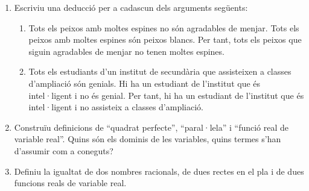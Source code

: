 \begin{enumerate}
\begin{enumerate}
\item
\begin{tabular}
[c]{ll}%
$P_{1}:$ & $\left(  \forall x\right)  \left(  R(x)\longrightarrow C(x)\right)
$\\
$P_{2}:$ & $\left(  \forall x\right)  \left(  T(x)\longrightarrow R(x)\right)
$\\\hline
$C:$ & $\left(  \forall x\right)  \left(  \lnot C(x)\longrightarrow\lnot
T(x)\right)  $%
\end{tabular}
$\ \ \ \ \ $

\item
\begin{tabular}
[c]{ll}%
$P_{1}:$ & $\left(  \forall x\right)  \left(  \exists y\right)  \left(
E(x)\longrightarrow\left(  M(x)\vee N(x)\right)  \right)  $\\
$P_{2}:$ & $\lnot\left(  \forall x\right)  \ M(x)$\\
$P_{3}:$ & $\left(  \forall x\right)  \ E(x)$\\\hline
$C:$ & $\left(  \exists x\right)  \ N(x)$%
\end{tabular}

\end{enumerate}

\item Escriviu una deducció per a cadascun dels arguments següents:

\begin{enumerate}
\item Tots els peixos amb moltes espines no són agradables de menjar. Tots
els peixos amb moltes espines són peixos blancs. Per tant, tots els peixos
que siguin agradables de menjar no tenen moltes espines.

\item Tots els estudiants d'un institut de secundària que assisteixen a
classes d'ampliació són genials. Hi ha un estudiant de l'institut que
és intel·ligent i no és genial. Per tant, hi ha un
estudiant de l'institut que és intel·ligent i no
assisteix a classes d'ampliació.
\end{enumerate}

\item Construïu definicions de \enquote{quadrat perfecte},
\enquote{paral·lela} i \enquote{funció real de variable real}. Quins
són els dominis de les variables, quins termes s'han d'assumir com a coneguts?

\item Definiu la igualtat de dos nombres racionals, de dues rectes en el pla i
de dues funcions reals de variable real.


\end{enumerate}
